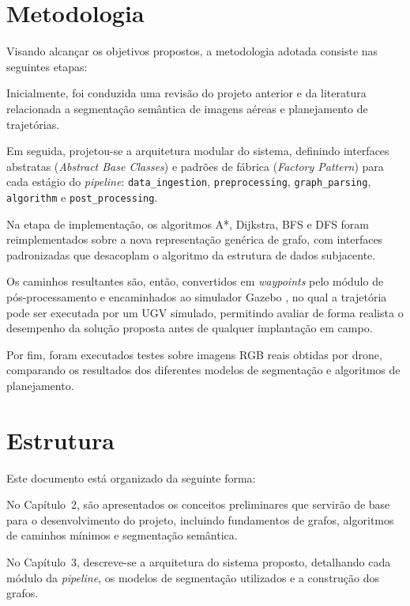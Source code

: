\documentclass[
    12pt,
    openright,
    oneside,
    a4paper,
    english,
    brazil
]{abntex2}
\begin{document}
\section{Metodologia}

Visando alcançar os objetivos propostos, a metodologia adotada consiste nas seguintes etapas:

Inicialmente, foi conduzida uma revisão do projeto anterior \cite{camelo2025} e da literatura relacionada a segmentação semântica de imagens aéreas e planejamento de trajetórias.

Em seguida, projetou-se a arquitetura modular do sistema, definindo interfaces abstratas (\textit{Abstract Base Classes}) e padrões de fábrica (\textit{Factory Pattern}) para cada estágio do \textit{pipeline}: \texttt{data\_ingestion}, \texttt{preprocessing}, \texttt{graph\_parsing}, \texttt{algorithm} e \texttt{post\_processing}.

Na etapa de implementação, os algoritmos A*, Dijkstra, BFS e DFS foram reimplementados sobre a nova representação genérica de grafo, com interfaces padronizadas que desacoplam o algoritmo da estrutura de dados subjacente.

Os caminhos resultantes são, então, convertidos em \textit{waypoints} pelo módulo de pós-processamento e encaminhados ao simulador Gazebo \cite{koenig2004}, no qual a trajetória pode ser executada por um UGV simulado, permitindo avaliar de forma realista o desempenho da solução proposta antes de qualquer implantação em campo.

Por fim, foram executados testes sobre imagens RGB reais obtidas por drone, comparando os resultados dos diferentes modelos de segmentação e algoritmos de planejamento.

\section{Estrutura}

Este documento está organizado da seguinte forma:

No Capítulo~2, são apresentados os conceitos preliminares que servirão de base para o desenvolvimento do projeto, incluindo fundamentos de grafos, algoritmos de caminhos mínimos e segmentação semântica.

No Capítulo~3, descreve-se a arquitetura do sistema proposto, detalhando cada módulo da \textit{pipeline}, os modelos de segmentação utilizados e a construção dos grafos.
\end{document}
